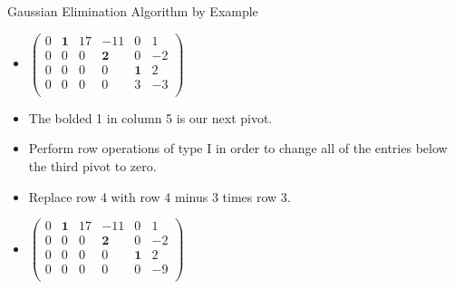 \documentclass{beamer}
\begin{document}
\begin{frame}{Gaussian Elimination Algorithm by Example}

\begin{itemize}
\item $
\begin{pmatrix}
0 & \textbf{1} &  17   &          -11   &          0   &    1  \\
0 &         0  &   0   &   \textbf{2}   &          0   &   -2  \\
0 &         0  &   0   &           0    &  \textbf{1}  &   2  \\
0 &         0  &   0   &           0    &          3   &   -3  \\
\end{pmatrix}
$
\item The bolded 1 in column 5 is our next pivot.
\item Perform row operations of type I in order to change all of the
entries below the third pivot to zero.
\item Replace row 4 with row 4 minus 3 times row 3.
\item $
\begin{pmatrix}
0 & \textbf{1} &  17   &          -11   &          0   &    1  \\
0 &         0  &   0   &   \textbf{2}   &          0   &   -2  \\
0 &         0  &   0   &           0    &  \textbf{1}  &   2  \\
0 &         0  &   0   &           0    &          0   &   -9  \\
\end{pmatrix}
$
\end{itemize}
\end{frame}

\end{document}
